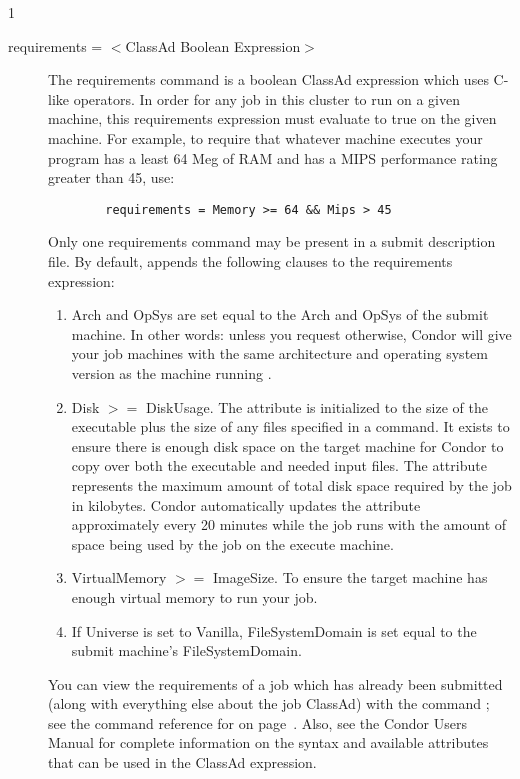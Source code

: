 \begin{ManPage}{\label{man-condor-submit}}{1}
\begin{description}
\item[requirements = $<$ClassAd Boolean Expression$>$]
The requirements
command is a boolean ClassAd expression which uses C-like operators. In
order for any job in this cluster to run on a given machine, this
requirements expression must evaluate to true on the given machine. For
example, to require that whatever machine executes your program has a
least 64 Meg of RAM and has a MIPS performance rating greater than 45,
use: 
\begin{verbatim}
        requirements = Memory >= 64 && Mips > 45
\end{verbatim}
Only one requirements command may be present in a
submit description file.
By default,  appends the following clauses to
the requirements expression:
\begin{enumerate}
	\item Arch and OpSys are set equal to the Arch and OpSys of the
submit machine.  In other words: unless you request otherwise, Condor will give your
job machines with the same architecture and operating system version as
the machine running .
	\item Disk $>=$ DiskUsage. 
The  attribute is initialized to the size of the
executable plus the size of any files specified in a
 command.
It exists to ensure there is enough disk space on the 
target machine for Condor to copy over both the executable
and needed input files.
The  attribute represents the maximum amount of
total disk space required by the job in kilobytes.
Condor automatically updates the  attribute
approximately every 20 minutes while the job runs with the
amount of space being used by the job on the execute machine.  
	\item VirtualMemory $>=$ ImageSize.  To ensure the target machine
has enough virtual memory to run your job.
	\item If Universe is set to Vanilla, FileSystemDomain is set equal to
the submit machine's FileSystemDomain.
\end{enumerate}
You can view the requirements of a job
which has already been submitted (along with everything else about the
job ClassAd) with the command ; see the command reference for
 on page~\pageref{man-condor-q}.  Also, see the Condor Users
Manual for complete information on the syntax and available attributes
that can be used in the ClassAd expression.



\end{description}
\end{ManPage}

